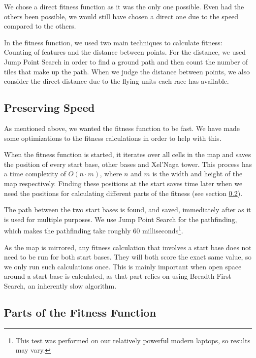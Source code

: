 We chose a direct fitness function as it was the only one possible. Even had the others been possible, we would still have chosen a direct one due to the speed compared to the others. 

In the fitness function, we used two main techniques to calculate fitness: Counting of features and the distance between points. For the distance, we used Jump Point Search\cite{harabor11a, harabor12, Podhraski2013jps} in order to find a ground path and then count the number of tiles that make up the path. When we judge the distance between points, we also consider the direct distance due to the flying units each race has available.

\subsection{Preserving Speed}
\label{methodology_mapfitness_speed}

As mentioned above, we wanted the fitness function to be fast. We have made some optimizations to the fitness calculations in order to help with this.

When the fitness function is started, it iterates over all cells in the map and saves the position of every start base, other bases and Xel'Naga tower. This process has a time complexity of $O(n\cdot m)$, where $n$ and $m$ is the width and height of the map respectively. Finding these positions at the start saves time later when we need the positions for calculating different parts of the fitness (see section \ref{methodology_mapfitness_parts}).

The path between the two start bases is found, and saved, immediately after as it is used for multiple purposes. We use Jump Point Search\cite{Podhraski2013jps} for the pathfinding, which makes the pathfinding take roughly 60 milliseconds\footnote{This test was performed on our relatively powerful modern laptops, so results may vary.}.

As the map is mirrored, any fitness calculation that involves a start base does not need to be run for both start bases. They will both score the exact same value, so we only run such calculations once. This is mainly important when open space around a start base is calculated, as that part relies on using Breadth-First Search, an inherently slow algorithm.

\subsection{Parts of the Fitness Function}
\label{methodology_mapfitness_parts}

